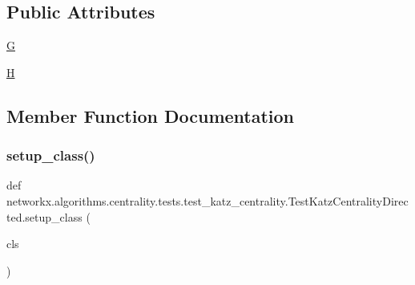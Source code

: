 \subsection*{Public Attributes}
\begin{DoxyCompactItemize}
\item 
\hyperlink{classnetworkx_1_1algorithms_1_1centrality_1_1tests_1_1test__katz__centrality_1_1TestKatzCentralityDirected_acb912984ba4a7de400946f7ddba7169c}{G}
\item 
\hyperlink{classnetworkx_1_1algorithms_1_1centrality_1_1tests_1_1test__katz__centrality_1_1TestKatzCentralityDirected_a88db565d25ac17b7ead4b2b899b1efce}{H}
\end{DoxyCompactItemize}


\subsection{Member Function Documentation}
\mbox{\label{classnetworkx_1_1algorithms_1_1centrality_1_1tests_1_1test__katz__centrality_1_1TestKatzCentralityDirected_aa6b1a9faa660083df3d93bacea0b8f8c}} 
\subsubsection{\texorpdfstring{setup\+\_\+class()}{setup\_class()}}
{\footnotesize\ttfamily def networkx.\+algorithms.\+centrality.\+tests.\+test\+\_\+katz\+\_\+centrality.\+Test\+Katz\+Centrality\+Directed.\+setup\+\_\+class (\begin{DoxyParamCaption}\item[{}]{cls }\end{DoxyParamCaption})}

